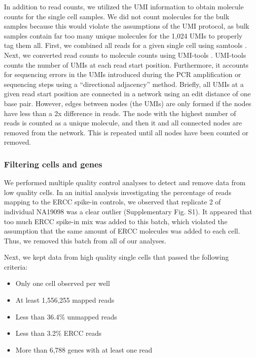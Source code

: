 In addition to read counts, we utilized the UMI information to obtain
molecule counts for the single cell samples. We did not count molecules
for the bulk samples because this would violate the assumptions of the
UMI protocol, as bulk samples contain far too many unique molecules for
the 1,024 UMIs to properly tag them all. First, we combined all reads
for a given single cell using samtools \citep{Li2009}. Next, we converted
read counts to molecule counts using UMI-tools \citep{Smith2016}.
UMI-tools counts the number of UMIs at each read start position.
Furthermore, it accounts for sequencing errors in the UMIs introduced
during the PCR amplification or sequencing steps using a ``directional
adjacency'' method. Briefly, all UMIs at a given read start position are
connected in a network using an edit distance of one base pair. However,
edges between nodes (the UMIs) are only formed if the nodes have less
than a 2x difference in reads. The node with the highest number of reads
is counted as a unique molecule, and then it and all connected nodes are
removed from the network. This is repeated until all nodes have been
counted or removed.

\subsubsection{Filtering cells and
genes}\label{filtering-cells-and-genes}

We performed multiple quality control analyses to detect and remove data
from low quality cells. In an initial analysis investigating the
percentage of reads mapping to the ERCC spike-in controls, we observed
that replicate 2 of individual NA19098 was a clear outlier
(Supplementary Fig. S1). It appeared that too much ERCC spike-in mix was
added to this batch, which violated the assumption that the same amount
of ERCC molecules was added to each cell. Thus, we removed this batch
from all of our analyses.

Next, we kept data from high quality single cells that passed the
following criteria:

\begin{itemize}
\itemsep1pt\parskip0pt
\item
  Only one cell observed per well
\item
  At least 1,556,255 mapped reads
\item
  Less than 36.4\% unmapped reads
\item
  Less than 3.2\% ERCC reads
\item
  More than 6,788 genes with at least one read
\end{itemize}

